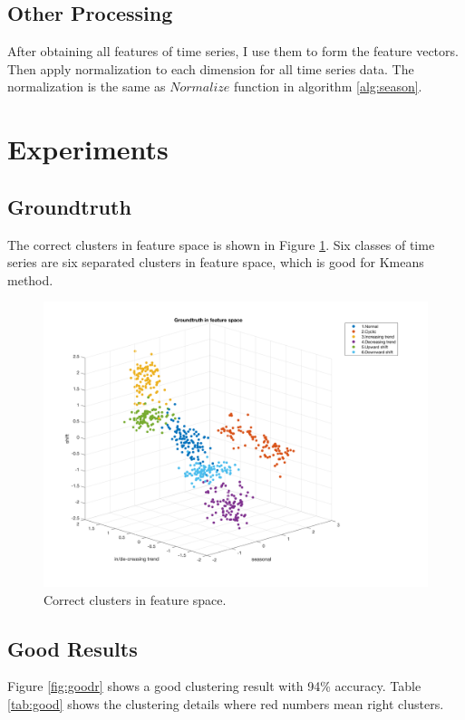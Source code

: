 \documentclass[a4paper]{article}
\begin{document}
\subsection{Other Processing}
After obtaining all features of time series, I use them to form the feature vectors. Then apply normalization to each dimension for all time series data. The normalization is the same as $Normalize$ function in algorithm \ref{alg:season}.

\section{Experiments}
\subsection{Groundtruth}
The correct clusters in feature space is shown in Figure \ref{fig:groundt}. Six classes of time series are six separated clusters in feature space, which is good for Kmeans method.
\begin{figure}[htbp]
\centering
\includegraphics[width=1\textwidth]{groundt.png}
\caption{\label{fig:groundt}Correct clusters in feature space.}
\end{figure}

\subsection{Good Results}
Figure \ref{fig:goodr} shows a good clustering result with 94\% accuracy. Table \ref{tab:good} shows the clustering details where red numbers mean right clusters.
\end{document}
